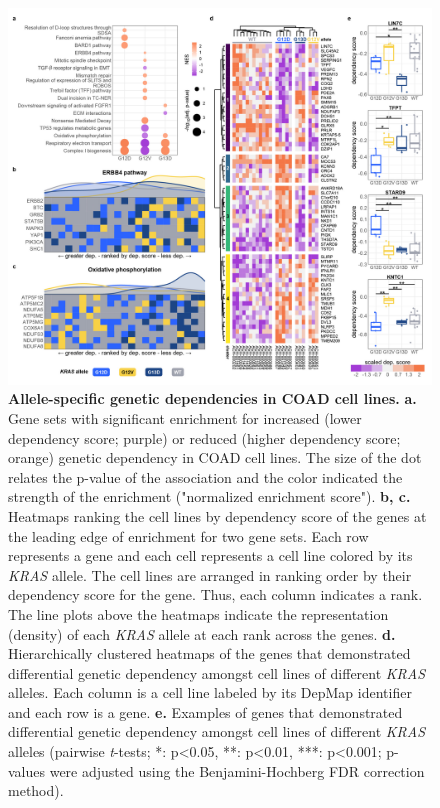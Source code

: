 \documentclass[english, 10pt, letterpaper]{article}
\newcommand{\KRAS}{\emph{KRAS}}
\begin{document}
\begin{figure}[h!]
\centering
\includegraphics[width=176mm]{figures/Fig_4_mod.jpg}
\caption{
    \textbf{Allele-specific genetic dependencies in COAD cell lines.}
    \textbf{a.} Gene sets with significant enrichment for increased (lower dependency score; purple) or reduced (higher dependency score; orange) genetic dependency in COAD cell lines. The size of the dot relates the p-value of the association and the color indicated the strength of the enrichment ("normalized enrichment score").
    \textbf{b, c.} Heatmaps ranking the cell lines by dependency score of the genes at the leading edge of enrichment for two gene sets. Each row represents a gene and each cell represents a cell line colored by its \KRAS{} allele. The cell lines are arranged in ranking order by their dependency score for the gene. Thus, each column indicates a rank. The line plots above the heatmaps indicate the representation (density) of each \KRAS{} allele at each rank across the genes.
    \textbf{d.} Hierarchically clustered heatmaps of the genes that demonstrated differential genetic dependency amongst cell lines of different \KRAS{} alleles. Each column is a cell line labeled by its DepMap identifier and each row is a gene.
    \textbf{e.} Examples of genes that demonstrated differential genetic dependency amongst cell lines of different \KRAS{} alleles (pairwise \emph{t}-tests; *: p<0.05, **: p<0.01, ***: p<0.001; p-values were adjusted using the Benjamini-Hochberg FDR correction method).
}
\label{fig:coad-dependency-main}
\end{figure}
\newpage
\newpage
\end{document}
